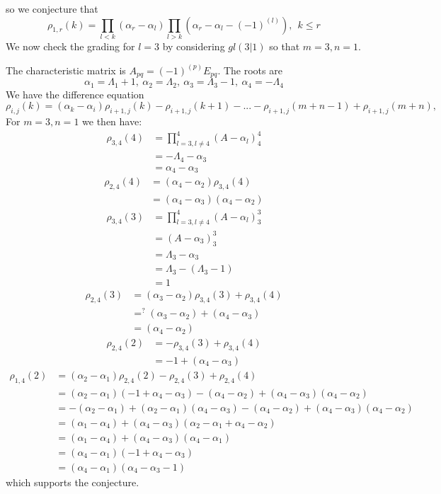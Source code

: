 \documentclass[12pt]{article}
\begin{document}
so we conjecture that
$$
\rho_{1,r}(k) = \prod_{l < k} (\alpha_r - \alpha_l) \prod_{l > k} (\alpha_r - \alpha_l - (-1)^{(l)}),~~k \leq r
$$
\newpage
We now check the grading for $l=3$ by considering $gl(3|1)$ so that $m=3,n=1$.

The characteristic matrix is $A_{pq} = (-1)^{(p)} E_{pq}$.
The roots are
$$
\alpha_1 = \Lambda_1 + 1,~ \alpha_2 = \Lambda_2 ,~ \alpha_3 = \Lambda_3 - 1,~\alpha_4 = -\Lambda_4 
$$
We have the difference equation
$$
\rho_{i,j}(k) = (\alpha_k - \alpha_i) \rho_{i+1,j}(k) - \rho_{i+1,j}(k+1) - ... - \rho_{i+1,j}(m+n-1) + \rho_{i+1,j}(m+n),
$$
For $m=3,n=1$ we then have:
\begin{align*}
\rho_{3,4}(4) &= \prod_{l=3,l \neq 4}^4(A - \alpha_l)^4_4 \\
&= -\Lambda_4 - \alpha_3 \\
&= \alpha_4 - \alpha_3 
\end{align*}
\begin{align*}
\rho_{2,4}(4) &= (\alpha_4 - \alpha_2) \rho_{3,4}(4) \\
&= (\alpha_4 - \alpha_3)(\alpha_4 - \alpha_2)
\end{align*}
\begin{align*}
\rho_{3,4}(3) &=  \prod_{l=3,l \neq 4}^4(A - \alpha_l)^3_3\\
&=  (A - \alpha_3)^3_3 \\
&= \Lambda_3 - \alpha_3 \\
&= \Lambda_3 - (\Lambda_3 - 1) \\
&= 1
\end{align*}
\begin{align*}
\rho_{2,4}(3) &= (\alpha_3 - \alpha_2) \rho_{3,4}(3) + \rho_{3,4}(4) \\
&=^? (\alpha_3 - \alpha_2) + (\alpha_4 - \alpha_3) \\
&= (\alpha_4 - \alpha_2)
\end{align*}
\begin{align*}
\rho_{2,4}(2) &=  -\rho_{3,4}(3) + \rho_{3,4}(4)\\
&= -1 + (\alpha_4 - \alpha_3)
\end{align*}
\begin{align*}
\rho_{1,4}(2) &= (\alpha_2 - \alpha_1) \rho_{2,4}(2) - \rho_{2,4}(3) + \rho_{2,4}(4) \\
&= (\alpha_2 - \alpha_1) (-1 + \alpha_4 - \alpha_3) - (\alpha_4 - \alpha_2) + (\alpha_4 - \alpha_3)(\alpha_4 - \alpha_2) \\
&= -(\alpha_2 - \alpha_1)  + (\alpha_2 - \alpha_1) (\alpha_4 - \alpha_3) - (\alpha_4 - \alpha_2) + (\alpha_4 - \alpha_3)(\alpha_4 - \alpha_2) \\
&= (\alpha_1 - \alpha_4)  + (\alpha_4 - \alpha_3)( \alpha_2 - \alpha_1 + \alpha_4 - \alpha_2 ) \\
&= (\alpha_1 - \alpha_4)  + (\alpha_4 - \alpha_3)(\alpha_4 - \alpha_1  ) \\
&= (\alpha_4 - \alpha_1) ( -1 + \alpha_4 - \alpha_3) \\
&= (\alpha_4 - \alpha_1) ( \alpha_4 - \alpha_3 - 1)
\end{align*}
which supports the conjecture.
\end{document}
